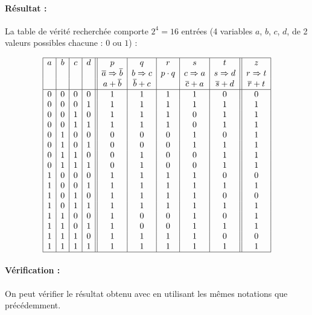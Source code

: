 \paragraph{Résultat :}
La table de vérité recherchée comporte $2^4 = 16$ entrées (4 variables $a$, $b$, $c$, $d$, 
de 2 valeurs possibles chacune : $0$ ou $1$) :

$$\begin{array}{|c|c|c|c||c|c|c|c|c||c|}
\hline
a & b & c & d & p & q & r & s & t & z \\
  &   &   &   & 
  \overline{a} \Rightarrow \overline{b} &
  b \Rightarrow c &
  p \cdot q &
  c \Rightarrow a &
  s \Rightarrow d &
  r \Rightarrow t \\
  &   &   &   &
  a + \overline{b} &
  \overline{b} + c &
                   &
  \overline{c} + a &
  \overline{s} + d &
  \overline{r} + t \\
\hline
0 & 0 & 0 & 0 & 1 & 1 & 1 & 1 & 0 & 0 \\
0 & 0 & 0 & 1 & 1 & 1 & 1 & 1 & 1 & 1 \\
0 & 0 & 1 & 0 & 1 & 1 & 1 & 0 & 1 & 1 \\
0 & 0 & 1 & 1 & 1 & 1 & 1 & 0 & 1 & 1 \\
0 & 1 & 0 & 0 & 0 & 0 & 0 & 1 & 0 & 1 \\
0 & 1 & 0 & 1 & 0 & 0 & 0 & 1 & 1 & 1 \\
0 & 1 & 1 & 0 & 0 & 1 & 0 & 0 & 1 & 1 \\
0 & 1 & 1 & 1 & 0 & 1 & 0 & 0 & 1 & 1 \\
1 & 0 & 0 & 0 & 1 & 1 & 1 & 1 & 0 & 0 \\
1 & 0 & 0 & 1 & 1 & 1 & 1 & 1 & 1 & 1 \\
1 & 0 & 1 & 0 & 1 & 1 & 1 & 1 & 0 & 0 \\
1 & 0 & 1 & 1 & 1 & 1 & 1 & 1 & 1 & 1 \\
1 & 1 & 0 & 0 & 1 & 0 & 0 & 1 & 0 & 1 \\
1 & 1 & 0 & 1 & 1 & 0 & 0 & 1 & 1 & 1 \\
1 & 1 & 1 & 0 & 1 & 1 & 1 & 1 & 0 & 0 \\
1 & 1 & 1 & 1 & 1 & 1 & 1 & 1 & 1 & 1 \\
\hline
\end{array}$$

\paragraph{Vérification :} On peut vérifier le résultat obtenu
avec \python{} en utilisant les mêmes notations que précédemment.


